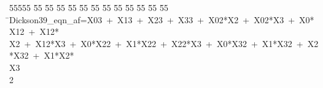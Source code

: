 %
%
\begin{tabbing}
55555 \= 55 \= 55 \= 55 \= 55 \= 55 \= 55 \= 55 \= 55 \= 55 \= 55 \= 55 \= 55 \= \>Dickson39\_eqn\_af=X03\ +\ X13\ +\ X23\ +\ X33\ +\ X02*X2\ +\ X02*X3\ +\ X0*X12\ +\ X12*\\[0pt]
\>X2\ +\ X12*X3\ +\ X0*X22\ +\ X1*X22\ +\ X22*X3\ +\ X0*X32\ +\ X1*X32\ +\ X2*X32\ +\ X1*X2*\\[0pt]
\>X3\\[0pt]
2\>\end{tabbing}
